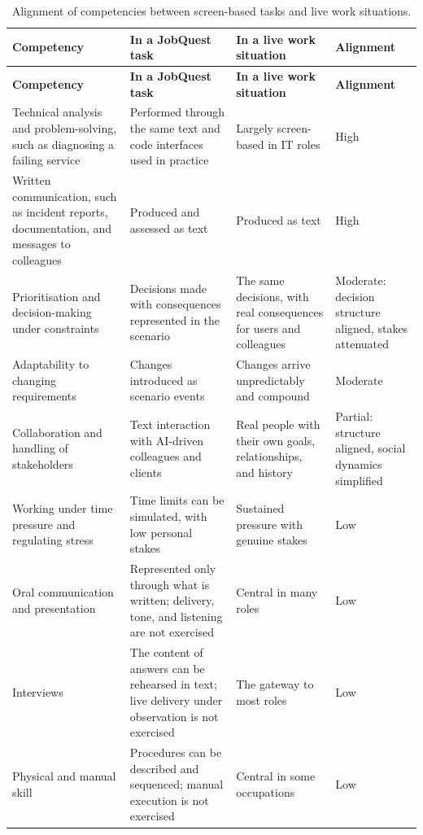 {\small{}\renewcommand{\arraystretch}{1.1}
\begin{longtable}{|>{\raggedright\arraybackslash}p{}|>{\raggedright\arraybackslash}p{}|>{\raggedright\arraybackslash}p{}|>{\raggedright\arraybackslash}p{}|}
\caption{Alignment of competencies between screen-\allowbreak{}based tasks and live work situations.} \\
\hline
\textbf{Competency} & \textbf{In a JobQuest task} & \textbf{In a live work situation} & \textbf{Alignment} \\ \hline
\endfirsthead
\hline
\textbf{Competency} & \textbf{In a JobQuest task} & \textbf{In a live work situation} & \textbf{Alignment} \\ \hline
\endhead
Technical analysis and problem-\allowbreak{}solving, such as diagnosing a failing service & Performed through the same text and code interfaces used in practice & Largely screen-\allowbreak{}based in IT roles & High \\ \hline
Written communication, such as incident reports, documentation, and messages to colleagues & Produced and assessed as text & Produced as text & High \\ \hline
Prioritisation and decision-\allowbreak{}making under constraints & Decisions made with consequences represented in the scenario & The same decisions, with real consequences for users and colleagues & Moderate: decision structure aligned, stakes attenuated \\ \hline
Adaptability to changing requirements & Changes introduced as scenario events & Changes arrive unpredictably and compound & Moderate \\ \hline
Collaboration and handling of stakeholders & Text interaction with AI-driven colleagues and clients & Real people with their own goals, relationships, and history & Partial: structure aligned, social dynamics simplified \\ \hline
Working under time pressure and regulating stress & Time limits can be simulated, with low personal stakes & Sustained pressure with genuine stakes & Low \\ \hline
Oral communication and presentation & Represented only through what is written; delivery, tone, and listening are not exercised & Central in many roles & Low \\ \hline
Interviews & The content of answers can be rehearsed in text; live delivery under observation is not exercised & The gateway to most roles & Low \\ \hline
Physical and manual skill & Procedures can be described and sequenced; manual execution is not exercised & Central in some occupations & Low \\ \hline
\end{longtable}
}

